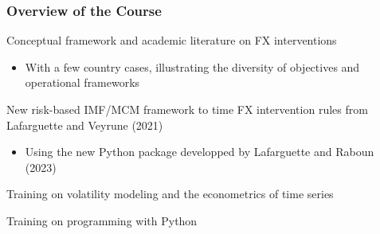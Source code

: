 \documentclass{beamer}
\newenvironment{wideenumerate}{\enumerate\addtolength{\itemsep}{10pt}}{\endenumerate}
\begin{document}
\begin{frame}
  \frametitle{Overview of the Course}
  \begin{wideenumerate}
  \item Conceptual framework and academic literature on FX interventions 
    \begin{itemize}
    \item With a few country cases, illustrating the diversity of objectives and operational frameworks    
    \end{itemize}

  \item New risk-based IMF/MCM framework to time FX intervention rules from Lafarguette and Veyrune (2021) \href{https://www.elibrary.imf.org/view/journals/001/2021/032/001.2021.issue-032-en.xml}{}
    \begin{itemize}
    \item Using the new Python package developped by Lafarguette and Raboun (2023) \href{https://pypi.org/project/varfxi/}{}
    \end{itemize}

  \item Training on volatility modeling and the econometrics of time series  
    
  \item Training on programming with Python
        
  \end{wideenumerate}
\end{frame}
\end{document}
